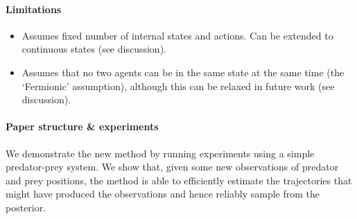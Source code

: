 \paragraph{Limitations}


\begin{itemize}
\item Assumes fixed number of internal states and actions. Can be extended to continuous states (see discussion).
\item Assumes that no two agents can be in the same state at the same time (the `Fermionic' assumption), although this can be relaxed in future work (see discussion).
\end{itemize}

\paragraph{Paper structure \& experiments}

We demonstrate the new method by running experiments using a simple predator-prey system. We show that, given some new observations of predator and prey positions, the method is able to efficiently estimate the trajectories that might have produced the observations and hence reliably sample from the posterior.


